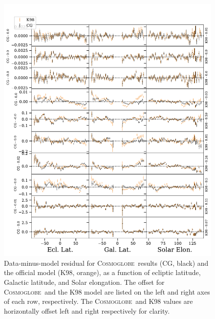 \documentclass{aa}
\def\cosmoglobe{\textsc{Cosmoglobe}}
\begin{document}
\begin{figure}
    \centering
	 \includegraphics[width=0.8\linewidth]{figs/tod_zodi_residuals.pdf}
	\caption{Data-minus-model residual for \cosmoglobe\ results (CG, black) and the official \citet{k98} model (K98, orange), as a function of ecliptic latitude, Galactic latitude, and Solar elongation. The offset for \cosmoglobe\ and the K98 model are listed on the left and right axes of each row, respectively. The \cosmoglobe\ and K98 values are horizontally offset left and right respectively for clarity.}
      \label{fig: zodi_timestream}
  \end{figure}
\end{document}
